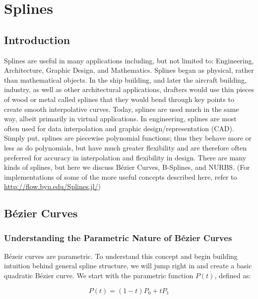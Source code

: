 
\usepackage{amsthm,amssymb}

	
\chapter*{Splines}
\label{ch:splines}


\section{Introduction}
\label{sec:splinesintro}

Splines are useful in many applications including, but not limited to: Engineering, Architecture, Graphic Design, and Mathematics. Splines began as physical, rather than mathematical objects. In the ship building, and later the aircraft building, industry, as well as other architectural applications, drafters would use thin pieces of wood or metal called splines that they would bend through key points to create smooth interpolative curves.  Today, splines are used much in the same way, albeit primarily in virtual applications.  In engineering, splines are most often used for data interpolation and graphic design/representation (CAD). Simply put, splines are piecewise polynomial functions; thus they behave more or less as do polynomials, but have much greater flexibility and are therefore often preferred for accuracy in interpolation and flexibility in design. There are many kinds of splines, but here we discuss Bézier Curves, B-Splines, and NURBS. (For implementations of some of the more useful concepts described here, refer to \url{http://flow.byu.edu/Splines.jl/})

\section{Bézier Curves}
\subsection{Understanding the Parametric Nature of Bézier Curves}
Bézeir curves are parametric.  To understand this concept and begin building intuition behind general spline structure, we will jump right in and create a basic quadratic Bézier curve. We start with the parametric function $P(t)$, defined as:

\begin{equation}
\label{eq:parametricrelation}
P(t) = (1-t)P_0 + tP_1
\end{equation}

